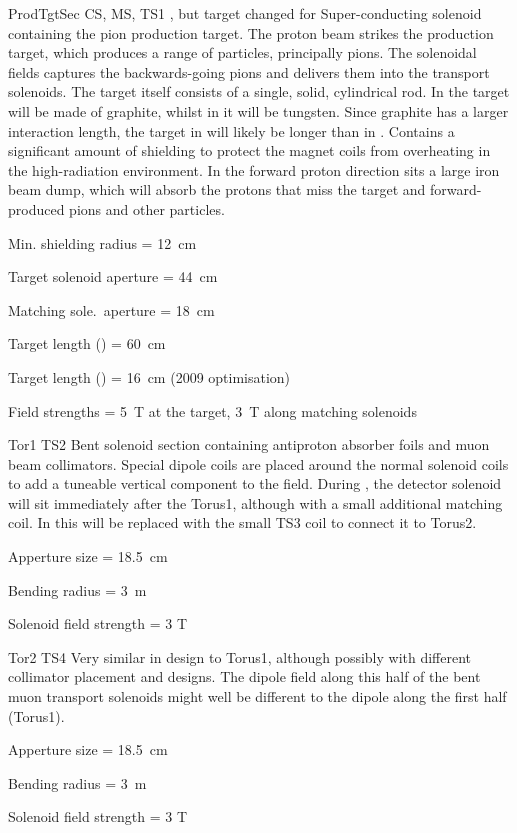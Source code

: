 {ProdTgtSec}
{CS, MS, TS1}
{\phaseI, but target changed for \phaseII}
{Super-conducting solenoid containing the pion production target.
  The proton beam strikes the production target, which produces a range of particles, principally pions.
  The solenoidal fields captures the backwards-going pions and delivers them into the transport solenoids.
  The target itself consists of a single, solid, cylindrical rod.
  In \phaseI the target will be made of graphite, whilst in \phaseII it will be tungsten.
 Since graphite has a larger interaction length, the target in \phaseI will likely be longer than in \phaseII.
  Contains a significant amount of shielding to protect the magnet coils from overheating in the high-radiation environment.
In the forward proton direction sits a large iron beam dump, which will absorb the protons that miss the target and forward-produced pions and other particles.
}
{\item Min. shielding radius = 12~cm%
 \item Target solenoid aperture = 44~cm%
 \item Matching sole.\ aperture = 18~cm%
 \item Target length (\phaseI) = 60~cm%
 \item Target length (\phaseII) = 16~cm (2009 optimisation)%
 \item Field strengths = 5~T at the target, 3~T along matching solenoids}

{Tor1}
{TS2}
{\phaseI }
{Bent solenoid section containing antiproton absorber foils and muon beam collimators.  Special dipole coils are placed around the normal solenoid coils to add a tuneable vertical component to the field.  During \phaseI, the detector solenoid will sit immediately after the Torus1, although with a small additional matching coil.  In \phaseII this will be replaced with the small TS3 coil to connect it to Torus2.}
{\item Apperture size = 18.5~cm
 \item Bending radius = 3~m 
\item Solenoid field strength = 3 T}

{Tor2}
{TS4}
{\phaseII}
{Very similar in design to Torus1, although possibly with different collimator placement and designs. The dipole field along this half of the bent muon transport solenoids might well be different to the dipole along the first half (Torus1).}
{\item Apperture size = 18.5~cm
 \item Bending radius = 3~m
\item Solenoid field strength = 3 T}


